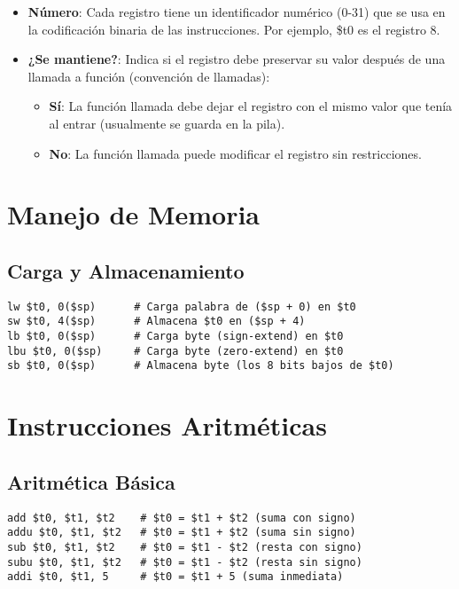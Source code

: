 \documentclass{article}
\begin{document}
\begin{itemize}
\item \textbf{Número}: Cada registro tiene un identificador numérico (0-31) que se usa en la codificación binaria de las instrucciones. Por ejemplo, \$t0 es el registro 8.

\item \textbf{¿Se mantiene?}: Indica si el registro debe preservar su valor después de una llamada a función (convención de llamadas):
\begin{itemize}
\item \textbf{Sí}: La función llamada debe dejar el registro con el mismo valor que tenía al entrar (usualmente se guarda en la pila).
\item \textbf{No}: La función llamada puede modificar el registro sin restricciones.
\end{itemize}
\end{itemize}

\section{Manejo de Memoria}

\subsection{Carga y Almacenamiento}
\begin{lstlisting}[language={[mips]Assembler}]
lw $t0, 0($sp)      # Carga palabra de ($sp + 0) en $t0
sw $t0, 4($sp)      # Almacena $t0 en ($sp + 4)
lb $t0, 0($sp)      # Carga byte (sign-extend) en $t0
lbu $t0, 0($sp)     # Carga byte (zero-extend) en $t0
sb $t0, 0($sp)      # Almacena byte (los 8 bits bajos de $t0)
\end{lstlisting}

\section{Instrucciones Aritméticas}

\subsection{Aritmética Básica}
\begin{lstlisting}[language={[mips]Assembler}]
add $t0, $t1, $t2    # $t0 = $t1 + $t2 (suma con signo)
addu $t0, $t1, $t2   # $t0 = $t1 + $t2 (suma sin signo)
sub $t0, $t1, $t2    # $t0 = $t1 - $t2 (resta con signo)
subu $t0, $t1, $t2   # $t0 = $t1 - $t2 (resta sin signo)
addi $t0, $t1, 5     # $t0 = $t1 + 5 (suma inmediata)
\end{lstlisting}
\end{document}

